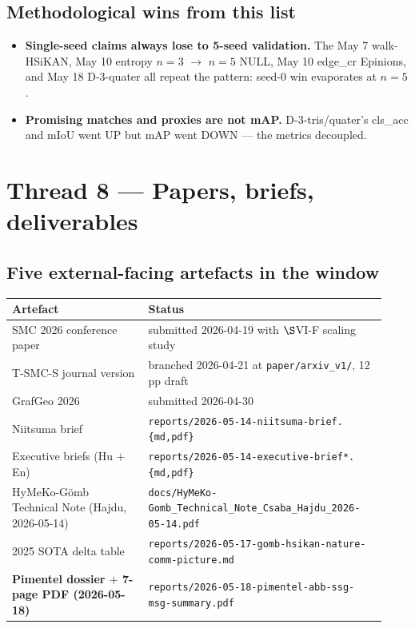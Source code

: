 \documentclass[11pt,a4paper]{article}
\newcommand{\code}[1]{\texttt{\small #1}}
\begin{document}
\subsection{Methodological wins from this list}

\begin{itemize}
  \item \textbf{Single-seed claims always lose to 5-seed validation.}
        The May 7 walk-HSiKAN, May 10 entropy $n{=}3$ $\to$ $n{=}5$ NULL,
        May 10 edge\_cr Epinions, and May 18 D-3-quater all repeat the
        pattern: seed-0 win evaporates at $n{=}5$.
  \item \textbf{Promising matches and proxies are not mAP.} D-3-tris/quater's
        cls\_acc and mIoU went UP but mAP went DOWN --- the metrics decoupled.
\end{itemize}

\section{Thread 8 --- Papers, briefs, deliverables}

\subsection{Five external-facing artefacts in the window}

\begin{center}\small
\begin{tabular}{p{0.34\linewidth} p{0.59\linewidth}}
\toprule
Artefact & Status \\
\midrule
SMC 2026 conference paper                                  & submitted 2026-04-19 with $\S$VI-F scaling study \\
T-SMC-S journal version                                    & branched 2026-04-21 at \code{paper/arxiv\_v1/}, 12 pp draft \\
GrafGeo 2026                                               & submitted 2026-04-30 \\
Niitsuma brief                                             & \code{reports/2026-05-14-niitsuma-brief.\{md,pdf\}} \\
Executive briefs (Hu $+$ En)                                & \code{reports/2026-05-14-executive-brief*.\{md,pdf\}} \\
HyMeKo-Gömb Technical Note (Hajdu, 2026-05-14)             & \code{docs/HyMeKo-Gomb\_Technical\_Note\_Csaba\_Hajdu\_2026-05-14.pdf} \\
2025 SOTA delta table                                      & \code{reports/2026-05-17-gomb-hsikan-nature-comm-picture.md} \\
\textbf{Pimentel dossier $+$ 7-page PDF (2026-05-18)}      & \code{reports/2026-05-18-pimentel-abb-ssg-msg-summary.pdf} \\
\bottomrule
\end{tabular}
\end{center}
\end{document}
